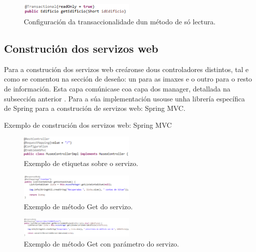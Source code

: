 \begin{figure}[tbh] 
	\begin{center}
		\includegraphics[width=0.5\textwidth]{figures/codigo/metodoNonTransaccional}
		\caption{Configuración da transaccionalidade dun método de só lectura.}
		\label{fig:metodoNonTransaccional}
	\end{center}
\end{figure}


\subsection{Construción dos servizos web}
Para a construción dos servizos web creáronse dous controladores distintos, tal e como se comentou na sección de deseño: un para as imaxes e o outro para o resto de información. Esta capa comúnicase coa capa dos manager, detallada na subsección anterior . Para a súa implementación usouse unha librería específica de Spring para a construción de servizos web: Spring MVC.


Exemplo de construción dos servizos web: Spring MVC
\begin{figure}[tbh] 
	\begin{center}
		\includegraphics[width=0.5\textwidth]{figures/codigo/controladorMuseo}
		\caption{Exemplo de etiquetas sobre o servizo.}
		\label{fig:controladorMuseo}
	\end{center}
\end{figure}

\begin{figure}[tbh] 
	\begin{center}
		\includegraphics[width=0.5\textwidth]{figures/codigo/chamadaServizoGetSimple}
		\caption{Exemplo de método Get do servizo.}
		\label{fig:chamadaServizoGetSimple}
	\end{center}
\end{figure}

\begin{figure}[tbh] 
	\begin{center}
		\includegraphics[width=0.5\textwidth]{figures/codigo/chamadaServizoGetParametro}
		\caption{Exemplo de método Get con parámetro do servizo.}
		\label{fig:chamadaServizoGetParametro}
	\end{center}
\end{figure}

